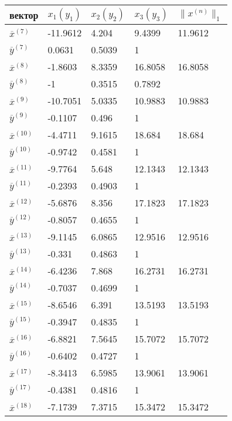 \documentclass[10pt, a4paper]{scrartcl}
\begin{document}
\begin{center}
\begin{tabular}{ | l  | l  | l  | l  | l |}
\hline
вектор & $x_1(y_1)$ & $x_2(y_2)$ & $x_3(y_3)$ & $\parallel x^{(n)} \parallel _1$ \\ \hline
$\overline{x}^{(7)}$ & -11.9612 & 4.204 & 9.4399 & 11.9612 \\ \hline
$\overline{y}^{(7)}$ & 0.0631 & 0.5039 & 1 &   \\ \hline
$\overline{x}^{(8)}$ & -1.8603 & 8.3359 & 16.8058 & 16.8058 \\ \hline
$\overline{y}^{(8)}$ & -1 & 0.3515 & 0.7892 &   \\ \hline
$\overline{x}^{(9)}$ & -10.7051 & 5.0335 & 10.9883 & 10.9883 \\ \hline
$\overline{y}^{(9)}$ & -0.1107 & 0.496 & 1 &   \\ \hline
$\overline{x}^{(10)}$ & -4.4711 & 9.1615 & 18.684 & 18.684 \\ \hline
$\overline{y}^{(10)}$ & -0.9742 & 0.4581 & 1 &   \\ \hline
$\overline{x}^{(11)}$ & -9.7764 & 5.648 & 12.1343 & 12.1343 \\ \hline
$\overline{y}^{(11)}$ & -0.2393 & 0.4903 & 1 &   \\ \hline
$\overline{x}^{(12)}$ & -5.6876 & 8.356 & 17.1823 & 17.1823 \\ \hline
$\overline{y}^{(12)}$ & -0.8057 & 0.4655 & 1 &   \\ \hline
$\overline{x}^{(13)}$ & -9.1145 & 6.0865 & 12.9516 & 12.9516 \\ \hline
$\overline{y}^{(13)}$ & -0.331 & 0.4863 & 1 &   \\ \hline
$\overline{x}^{(14)}$ & -6.4236 & 7.868 & 16.2731 & 16.2731 \\ \hline
$\overline{y}^{(14)}$ & -0.7037 & 0.4699 & 1 &   \\ \hline
$\overline{x}^{(15)}$ & -8.6546 & 6.391 & 13.5193 & 13.5193 \\ \hline
$\overline{y}^{(15)}$ & -0.3947 & 0.4835 & 1 &   \\ \hline
$\overline{x}^{(16)}$ & -6.8821 & 7.5645 & 15.7072 & 15.7072 \\ \hline
$\overline{y}^{(16)}$ & -0.6402 & 0.4727 & 1 &   \\ \hline
$\overline{x}^{(17)}$ & -8.3413 & 6.5985 & 13.9061 & 13.9061 \\ \hline
$\overline{y}^{(17)}$ & -0.4381 & 0.4816 & 1 &   \\ \hline
$\overline{x}^{(18)}$ & -7.1739 & 7.3715 & 15.3472 & 15.3472 \\ \hline

\end{tabular}
\end{center}
\end{document}
